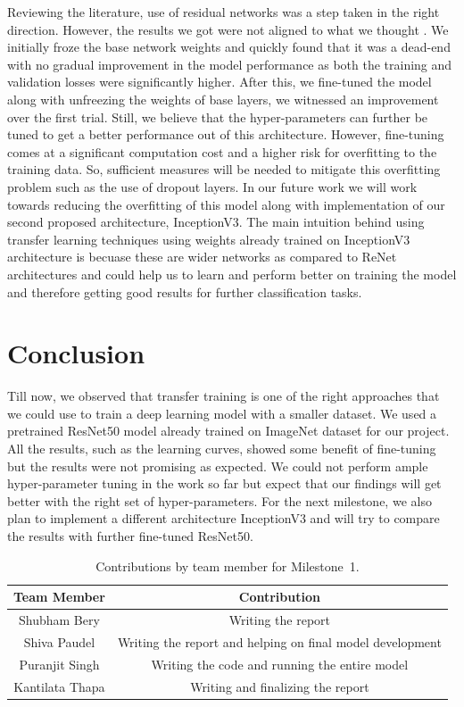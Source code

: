 \documentclass{report}
\begin{document}
Reviewing the literature, use of residual networks was a step taken in the right direction. However, the results we got were not aligned to what we thought \cite{theckedath2020detecting}. We initially froze the base network weights and quickly found that it was a dead-end with no gradual improvement in the model performance as both the training and validation losses were significantly higher. After this, we fine-tuned the model along with unfreezing the weights of base layers, we witnessed an improvement over the first trial. Still, we believe that the hyper-parameters can further be tuned to get a better performance out of this architecture. However, fine-tuning comes at a significant computation cost and a higher risk for overfitting to the training data. So, sufficient measures will be needed to mitigate this overfitting problem such as the use of dropout layers. In our future work we will work towards reducing the overfitting of this model along with implementation of our second proposed architecture, InceptionV3. The main intuition behind using transfer learning techniques using weights already trained on InceptionV3 architecture is becuase these are wider networks as compared to ReNet architectures and could help us to learn and perform better on training the model and therefore getting good results for further classification tasks.

\section{Conclusion}

Till now, we observed that transfer training is one of the right approaches that we could use to train a deep learning model with a smaller dataset. We used a pretrained ResNet50 model already trained on ImageNet dataset for our project. All the results, such as the learning curves, showed some benefit of fine-tuning but the results were not promising as expected. We could not perform ample hyper-parameter tuning in the work so far but expect that our findings will get better with the right set of hyper-parameters. For the next milestone, we also plan to implement a different architecture InceptionV3 and will try to compare the results with further fine-tuned ResNet50.


\begin{table}[H]
    \caption{Contributions by team member for Milestone~1.}
    \centering
    \begin{tabular}{|c|c|} \hline
    {\bf Team Member}     &  {\bf Contribution}  \\ \hline
    Shubham Bery     & Writing the report \\
    Shiva Paudel    & Writing the report and helping on final model development\\
    Puranjit Singh     & Writing the code and running the entire model\\
    Kantilata Thapa     & Writing and finalizing the report\\ \hline
    \end{tabular}
    \label{tab:contribution1}
\end{table}
\end{document}

